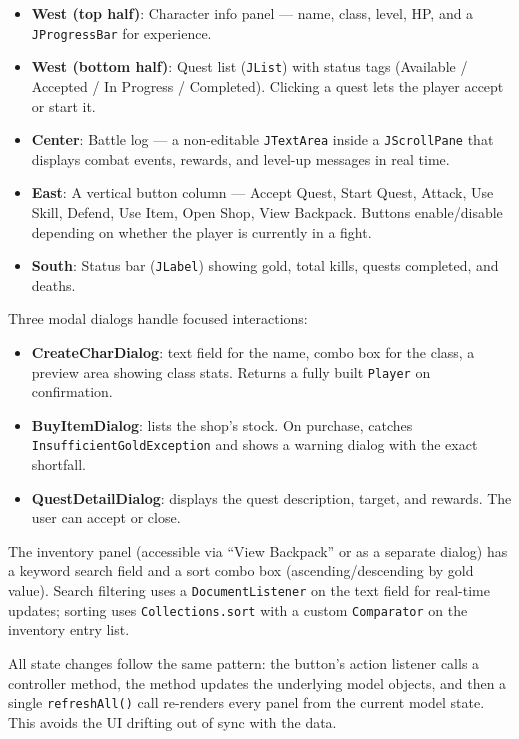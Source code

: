 \documentclass[12pt,a4paper]{article}
\begin{document}
\begin{itemize}[leftmargin=*]
    \item \textbf{West (top half)}: Character info panel --- name, class, level, HP, and a \texttt{JProgressBar} for experience.
    \item \textbf{West (bottom half)}: Quest list (\texttt{JList}) with status tags (Available / Accepted / In Progress / Completed). Clicking a quest lets the player accept or start it.
    \item \textbf{Center}: Battle log --- a non-editable \texttt{JTextArea} inside a \texttt{JScrollPane} that displays combat events, rewards, and level-up messages in real time.
    \item \textbf{East}: A vertical button column --- Accept Quest, Start Quest, Attack, Use Skill, Defend, Use Item, Open Shop, View Backpack. Buttons enable/disable depending on whether the player is currently in a fight.
    \item \textbf{South}: Status bar (\texttt{JLabel}) showing gold, total kills, quests completed, and deaths.
\end{itemize}

Three modal dialogs handle focused interactions:
\begin{itemize}[leftmargin=*]
    \item \textbf{CreateCharDialog}: text field for the name, combo box for the class, a preview area showing class stats. Returns a fully built \texttt{Player} on confirmation.
    \item \textbf{BuyItemDialog}: lists the shop's stock. On purchase, catches \texttt{InsufficientGoldException} and shows a warning dialog with the exact shortfall.
    \item \textbf{QuestDetailDialog}: displays the quest description, target, and rewards. The user can accept or close.
\end{itemize}

The inventory panel (accessible via ``View Backpack'' or as a separate dialog) has a keyword search field and a sort combo box (ascending/descending by gold value). Search filtering uses a \texttt{DocumentListener} on the text field for real-time updates; sorting uses \texttt{Collections.sort} with a custom \texttt{Comparator} on the inventory entry list.

All state changes follow the same pattern: the button's action listener calls a controller method, the method updates the underlying model objects, and then a single \texttt{refreshAll()} call re-renders every panel from the current model state. This avoids the UI drifting out of sync with the data.
\end{document}
